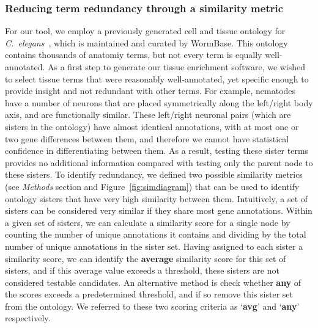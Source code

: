 \subsubsection*{Reducing term redundancy through a similarity metric}
For our tool, we employ a previously generated cell and tissue ontology for
\emph{C.~elegans}~\citep{Lee2003}, which is maintained and curated by WormBase.
This ontology contains thousands of anatomiy terms, but not every term is
equally well-annotated. As a first step to generate our tissue enrichment
software, we wished to select tissue terms that were reasonably well-annotated,
yet specific enough to provide insight and not redundant with other terms. For
example, nematodes have a number of neurons that are placed symmetrically along
the left/right body axis, and are functionally similar. These left/right neuronal
pairs (which are sisters in the ontology) have almost identical annotations,
with at most one or two gene differences between them, and therefore we cannot
have statistical confidence in differentiating between them. As a result, testing
these sister terms provides no additional information compared with testing only
the parent node to these sisters. To identify redundancy, we defined two possible
similarity metrics (see \emph{Methods} section and Figure~\ref{fig:simdiagram})
that can be used to identify ontology sisters that have very high similarity
between them. Intuitively, a set of sisters can be considered very similar if
they share most gene annotations. Within a given set of sisters, we can
calculate a similarity score for a single node by counting the number of
unique annotations it contains and dividing by the total number of unique
annotations in the sister set. Having assigned to each sister a similarity score,
we can identify the \textbf{average} similarity score for this set of sisters,
and if this average value exceeds a threshold, these sisters are not considered
testable candidates. An alternative method is check whether \textbf{any} of the
scores exceeds a predetermined threshold, and if so remove this sister set from
the ontology. We referred to these two scoring criteria as `\textbf{avg}' and
`\textbf{any}' respectively.

